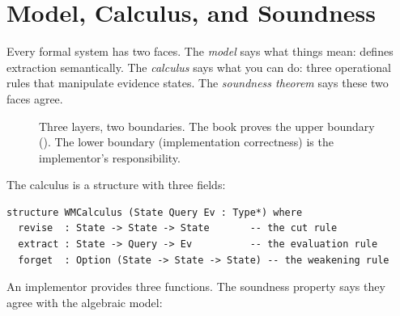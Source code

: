 \documentclass[11pt,openany]{report}
\begin{document}
\section{Model, Calculus, and Soundness}
\label{sec:calculus-soundness}

Every formal system has two faces.  The \emph{model} says what
things mean:  defines extraction
semantically.  The \emph{calculus} says what you can do: three
operational rules that manipulate evidence states.  The
\emph{soundness theorem} says these two faces agree.

\begin{figure}[htbp]
\centering
{}
\caption{Three layers, two boundaries.  The book proves the upper
  boundary ().  The lower boundary
  (implementation correctness) is the implementor's responsibility.}
\label{fig:model-calculus-soundness}
\end{figure}

The calculus is a structure with three fields:

\begin{lstlisting}[language={}]
structure WMCalculus (State Query Ev : Type*) where
  revise  : State -> State -> State       -- the cut rule
  extract : State -> Query -> Ev          -- the evaluation rule
  forget  : Option (State -> State -> State) -- the weakening rule
\end{lstlisting}

\noindent
An implementor provides three functions.  The soundness property
says they agree with the algebraic model:
\end{document}
